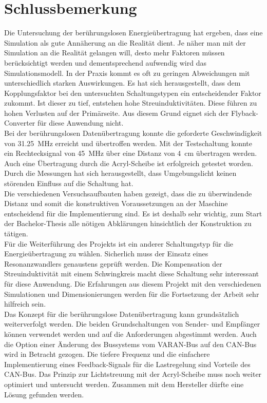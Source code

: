 \section{Schlussbemerkung}
\label{sec:Schlussbemerkung}

Die Untersuchung der berührungslosen Energieübertragung hat ergeben, dass eine Simulation als gute Annäherung an die Realität dient. Je näher man mit der Simulation an die Realität gelangen will, desto mehr Faktoren müssen berücksichtigt werden und dementsprechend aufwendig wird das Simulationsmodell. In der Praxis kommt es oft zu geringen Abweichungen mit unterschiedlich starken Auswirkungen. Es hat sich herausgestellt, dass dem Kopplungsfaktor bei den untersuchten Schaltungstypen ein entscheidender Faktor zukommt. Ist dieser zu tief, entstehen hohe Streuinduktivitäten. Diese führen zu hohen Verlusten auf der Primärseite. Aus diesem Grund eignet sich der Flyback-Converter für diese Anwendung nicht.
\newline \\
Bei der berührungslosen Datenübertragung konnte die geforderte Geschwindigkeit von \linebreak \SI{31.25}{MHz} erreicht und übertroffen werden. Mit der Testschaltung konnte ein Rechtecksignal von \SI{45}{MHz} über eine Distanz von \SI{4}{cm} übertragen werden. Auch eine Übertragung durch die Acryl-Scheibe ist erfolgreich getestet worden. Durch die Messungen hat sich herausgestellt, dass Umgebungslicht keinen störenden Einfluss auf die Schaltung hat.
\newline \\
Die verschiedenen Versuchsaufbauten haben gezeigt, dass die zu überwindende Distanz und somit die konstruktiven Voraussetzungen an der Maschine entscheidend für die Implementierung sind. Es ist deshalb sehr wichtig, zum Start der Bachelor-Thesis alle nötigen Abklärungen hinsichtlich der Konstruktion zu tätigen.
\newline \\
Für die Weiterführung des Projekts ist ein anderer Schaltungstyp für die Energieübertragung zu wählen. Sicherlich muss der Einsatz eines Resonanzwandlers genaustens geprüft werden. Die Kompensation der Streuinduktivität mit einem Schwingkreis macht diese Schaltung sehr interessant für diese Anwendung. Die Erfahrungen aus diesem Projekt mit den verschiedenen Simulationen und Dimensionierungen werden für die Fortsetzung der Arbeit sehr hilfreich sein.
\newline \\
Das Konzept für die berührungslose Datenübertragung kann grundsätzlich weiterverfolgt werden. Die beiden Grundschaltungen von Sender- und Empfänger können verwendet werden und auf die Anforderungen abgestimmt werden. Auch die Option einer Änderung des Bussystems vom VARAN-Bus auf den CAN-Bus wird in Betracht gezogen. Die tiefere Frequenz und die einfachere Implementierung eines Feedback-Signals für die Lastregelung sind Vorteile des CAN-Bus. Das Prinzip zur Lichtstreuung mit der Acryl-Scheibe muss noch weiter optimiert und untersucht werden. Zusammen mit dem Hersteller dürfte eine Lösung gefunden werden.
